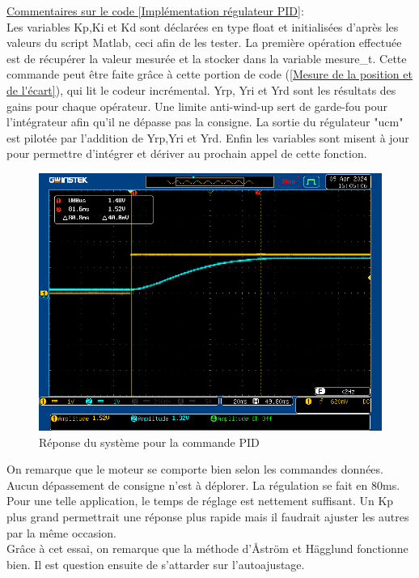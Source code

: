 \underline{Commentaires sur le code \ref{Implémentation régulateur PID}}:\\

Les variables Kp,Ki et Kd sont déclarées en type float et initialisées d'après les valeurs du script Matlab, ceci afin de les tester. La première opération effectuée est de récupérer la valeur mesurée et la stocker dans la variable mesure\_t. Cette commande peut être faite grâce à cette portion de code (\ref{Mesure de la position et de l'écart}), qui lit le codeur incrémental. Yrp, Yri et Yrd sont les résultats des gains pour chaque opérateur. Une limite anti-wind-up sert de garde-fou pour l'intégrateur afin qu'il ne dépasse pas la consigne. La sortie du régulateur "ucm" est pilotée par l'addition de Yrp,Yri et Yrd. Enfin les variables sont misent à jour pour permettre d'intégrer et dériver au prochain appel de cette fonction.

\begin{figure}[h]
	\centering
	\includegraphics[width=0.8\linewidth]{img/upRegPIDTest1}
	\caption{Réponse du système pour la commande PID}
	\label{fig:Réponse du système pour la commande PID}
\end{figure}

On remarque que le moteur se comporte bien selon les commandes données. Aucun dépassement de consigne n'est à déplorer. La régulation se fait en 80ms. Pour une telle application, le temps de réglage est nettement suffisant. Un Kp plus grand permettrait une réponse plus rapide mais il faudrait ajuster les autres par la même occasion. \\
Grâce à cet essai, on remarque que la méthode d'Åström et Hägglund fonctionne bien. Il est question ensuite de s'attarder sur l'autoajustage. 

\newpage

